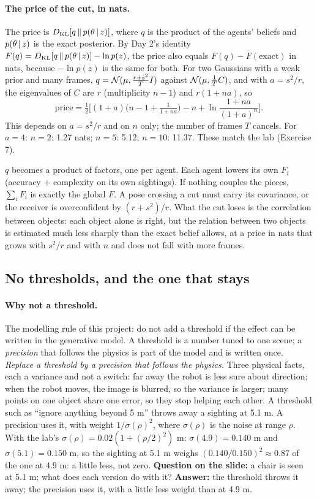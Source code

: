 \documentclass[11pt]{article}
\newcommand{\slt}[1]{\emph{#1}}   %
\begin{document}
\paragraph{The price of the cut, in nats.} The price is $D_{\mathrm{KL}}\!\left[q\,\middle\|\,p(\theta\,|\, z)\right]$, where $q$ is the product of the agents' beliefs and $p(\theta\,|\, z)$ is the exact posterior. By Day 2's identity $F(q)=D_{\mathrm{KL}}\!\left[q\,\middle\|\,p(\theta\,|\, z)\right]-\ln p(z)$, the price also equals $F(q)-F(\text{exact})$ in nats, because $-\ln p(z)$ is the same for both. For two Gaussians with a weak prior and many frames, $q=\mathcal{N}(\mu,\tfrac{r+s^2}{T}I)$ against $\mathcal{N}(\mu,\tfrac1T C)$, and with $a=s^2/r$, the eigenvalues of $C$ are $r$ (multiplicity $n-1$) and $r(1+na)$, so
\[
\text{price}=\tfrac12\Big[(1+a)\Big(n-1+\tfrac1{1+na}\Big)-n+\ln\frac{1+na}{(1+a)^n}\Big].
\]
This depends on $a=s^2/r$ and on $n$ only; the number of frames $T$ cancels. For $a=4$: $n=2$: 1.27 nats; $n=5$: 5.12; $n=10$: 11.37. These match the lab (Exercise 7).

\begin{keyidea}
$q$ becomes a product of factors, one per agent. Each agent lowers its own $F_i$ (accuracy + complexity on its own sightings). If nothing couples the pieces, $\sum_i F_i$ is exactly the global $F$. A pose crossing a cut must carry its covariance, or the receiver is overconfident by $(r+s^2)/r$. What the cut loses is the correlation between objects: each object alone is right, but the relation between two objects is estimated much less sharply than the exact belief allows, at a price in nats that grows with $s^2/r$ and with $n$ and does not fall with more frames.
\end{keyidea}

\subsection{No thresholds, and the one that stays}

\paragraph{Why not a threshold.} The modelling rule of this project: do not add a threshold if the effect can be written in the generative model. A threshold is a number tuned to one scene; a \emph{precision} that follows the physics is part of the model and is written once. \slt{Replace a threshold by a precision that follows the physics.} Three physical facts, each a variance and not a switch: far away the robot is less sure about direction; when the robot moves, the image is blurred, so the variance is larger; many points on one object share one error, so they stop helping each other. A threshold such as ``ignore anything beyond 5 m'' throws away a sighting at 5.1 m. A precision uses it, with weight $1/\sigma(\rho)^2$, where $\sigma(\rho)$ is the noise at range $\rho$. With the lab's $\sigma(\rho)=0.02(1+(\rho/2)^2)$ m: $\sigma(4.9)=0.140$ m and $\sigma(5.1)=0.150$ m, so the sighting at 5.1 m weighs $(0.140/0.150)^2\approx0.87$ of the one at 4.9 m: a little less, not zero. \textbf{Question on the slide:} a chair is seen at 5.1 m; what does each version do with it? \textbf{Answer:} the threshold throws it away; the precision uses it, with a little less weight than at 4.9 m.
\end{document}
